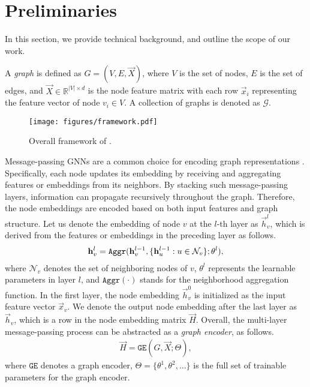 \section{Preliminaries}
In this section, we provide technical background, and outline the scope of our work.

A \emph{graph} is defined as \( G = (V, E, \vec{X}) \), where \( V \) is the set of nodes, \( E \) is the set of edges, and \( \vec{X} \in \mathbb{R}^{|V| \times d} \) is the node feature matrix with each row \( \vec{x}_i \) representing the feature vector of node \( v_i \in V \). A collection of graphs is denoted as \( \mathcal{G} \).

\begin{figure*}[t]
\centering
\texttt{[image: figures/framework.pdf]}%
\vspace{-1mm}%
\caption{Overall framework of \model.}
\label{fig.framework}
\end{figure*}

Message-passing GNNs are a common choice for encoding graph representations \cite{wu2020comprehensive}. Specifically, each node updates its embedding by receiving and aggregating features or embeddings from its neighbors. By stacking such message-passing layers, information can propagate recursively throughout the graph. Therefore, the node embeddings are encoded based on both input features and graph structure. Let us denote the embedding of node \( v \) at the \( l \)-th layer as \( \vec{h}^l_v \), which is derived from the features or embeddings in the preceding layer as follows.
\begin{align}
    \mathbf{h}^l_v = \mathtt{Aggr}(\mathbf{h}^{l-1}_v, \{\mathbf{h}^{l-1}_u : u\in\mathcal{N}_v\}; \theta^l),
\end{align}
where \( \mathcal{N}_v \) denotes the set of neighboring nodes of \( v \), \( \theta^l \) represents the learnable parameters in layer \( l \), and \( \mathtt{Aggr}(\cdot) \) stands for the neighborhood aggregation function. In the first layer, the node embedding \( \vec{h}^0_v \) is initialized as the input feature vector $\vec{x}_v$. We denote the output node embedding after the last layer as \( \vec{h}_v \), which is a row in the node embedding matrix \( \vec{H} \). Overall, the multi-layer message-passing process can be abstracted as a \emph{graph encoder}, as follows. 
\begin{align}
    \vec{H} = \mathtt{GE}(G,\vec{X};\Theta),
\end{align}
where $\mathtt{GE}$ denotes a graph encoder, \( \Theta = \{\theta^1, \theta^2, \ldots\} \) is the full set of trainable parameters for the graph encoder.

